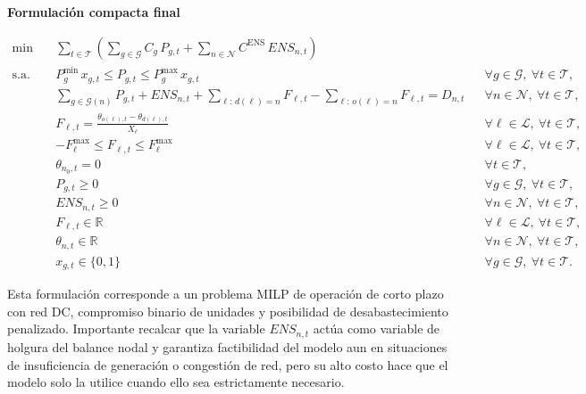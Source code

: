 \begin{enumerate}
\textbf{Formulación compacta final}

\[
\begin{aligned}
\min \quad &
\sum_{t\in\mathcal{T}} \left(
\sum_{g\in\mathcal{G}} C_g\,P_{g,t}
+
\sum_{n\in\mathcal{N}} C^{\text{ENS}}\,ENS_{n,t}
\right)\\[1mm]
\text{s.a.}\quad
& P_g^{\min}\,x_{g,t} \le P_{g,t} \le P_g^{\max}\,x_{g,t}
&& \forall g\in\mathcal{G},\ \forall t\in\mathcal{T},\\
& \sum_{g\in\mathcal{G}(n)} P_{g,t}
+ ENS_{n,t}
+ \sum_{\ell:\,d(\ell)=n} F_{\ell,t}
- \sum_{\ell:\,o(\ell)=n} F_{\ell,t}
= D_{n,t}
&& \forall n\in\mathcal{N},\ \forall t\in\mathcal{T},\\
& F_{\ell,t}
= \frac{\theta_{o(\ell),t}-\theta_{d(\ell),t}}{X_\ell}
&& \forall \ell\in\mathcal{L},\ \forall t\in\mathcal{T},\\
& -F_\ell^{\max}\le F_{\ell,t}\le F_\ell^{\max}
&& \forall \ell\in\mathcal{L},\ \forall t\in\mathcal{T},\\
& \theta_{n_0,t}=0
&& \forall t\in\mathcal{T},\\
& P_{g,t}\ge 0
&& \forall g\in\mathcal{G},\ \forall t\in\mathcal{T},\\
& ENS_{n,t}\ge 0
&& \forall n\in\mathcal{N},\ \forall t\in\mathcal{T},\\
& F_{\ell,t}\in\mathbb{R}
&& \forall \ell\in\mathcal{L},\ \forall t\in\mathcal{T},\\
& \theta_{n,t}\in\mathbb{R}
&& \forall n\in\mathcal{N},\ \forall t\in\mathcal{T},\\
& x_{g,t}\in\{0,1\}
&& \forall g\in\mathcal{G},\ \forall t\in\mathcal{T}.
\end{aligned}
\]

Esta formulación corresponde a un problema MILP de operación de corto plazo con red DC, compromiso binario de unidades y posibilidad de desabastecimiento penalizado. Importante recalcar que la variable \(ENS_{n,t}\) actúa como variable de holgura del balance nodal y garantiza factibilidad del modelo aun en situaciones de insuficiencia de generación o congestión de red, pero su alto costo hace que el modelo solo la utilice cuando ello sea estrictamente necesario.
\end{enumerate}
